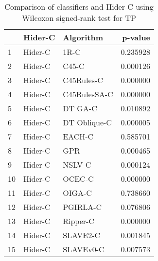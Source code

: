 \begin{table}
\footnotesize
\caption{Comparison of classifiers and Hider-C using Wilcoxon signed-rank test for TP}
\label{tab:Hider-C wilcoxon TP comparison}
\begin{tabular}{lllr}
\hline
 & Hider-C & Algorithm & p-value \\
\hline
1 & Hider-C & 1R-C & 0.235928 \\
2 & Hider-C & C45-C & 0.000126 \\
3 & Hider-C & C45Rules-C & 0.000000 \\
4 & Hider-C & C45RulesSA-C & 0.000000 \\
5 & Hider-C & DT GA-C & 0.010892 \\
6 & Hider-C & DT Oblique-C & 0.000005 \\
7 & Hider-C & EACH-C & 0.585701 \\
8 & Hider-C & GPR & 0.000465 \\
9 & Hider-C & NSLV-C & 0.000124 \\
10 & Hider-C & OCEC-C & 0.000000 \\
11 & Hider-C & OIGA-C & 0.738660 \\
12 & Hider-C & PGIRLA-C & 0.076806 \\
13 & Hider-C & Ripper-C & 0.000000 \\
14 & Hider-C & SLAVE2-C & 0.001845 \\
15 & Hider-C & SLAVEv0-C & 0.007573 \\
\hline
\end{tabular}
\end{table}
